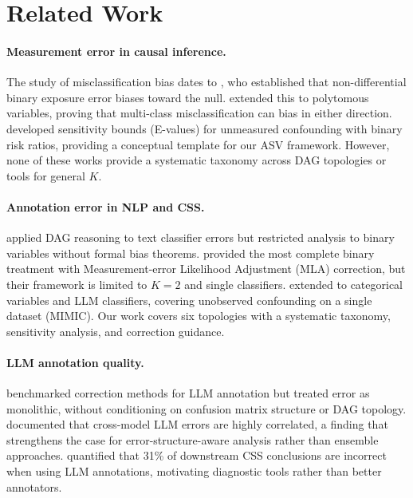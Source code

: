 \documentclass[11pt]{article}
\begin{document}
\section{Related Work}

\paragraph{Measurement error in causal inference.}
The study of misclassification bias dates to \citet{bross1954}, who established that non-differential binary exposure error biases toward the null.
\citet{brenner1993} extended this to polytomous variables, proving that multi-class misclassification can bias in either direction.
\citet{vanderweele2019} developed sensitivity bounds (E-values) for unmeasured confounding with binary risk ratios, providing a conceptual template for our ASV framework.
However, none of these works provide a systematic taxonomy across DAG topologies or tools for general $K$.

\paragraph{Annotation error in NLP and CSS.}
\citet{wood-doughty2018} applied DAG reasoning to text classifier errors but restricted analysis to binary variables without formal bias theorems.
\citet{teblunthuis2024} provided the most complete binary treatment with Measurement-error Likelihood Adjustment (MLA) correction, but their framework is limited to $K=2$ and single classifiers.
\citet{lee2024} extended to categorical variables and LLM classifiers, covering unobserved confounding on a single dataset (MIMIC).
Our work covers six topologies with a systematic taxonomy, sensitivity analysis, and correction guidance.

\paragraph{LLM annotation quality.}
\citet{jerzak2025} benchmarked correction methods for LLM annotation but treated error as monolithic, without conditioning on confusion matrix structure or DAG topology.
\citet{kim2025} documented that cross-model LLM errors are highly correlated, a finding that strengthens the case for error-structure-aware analysis rather than ensemble approaches.
\citet{baumann2025} quantified that 31\% of downstream CSS conclusions are incorrect when using LLM annotations, motivating diagnostic tools rather than better annotators.
\end{document}
